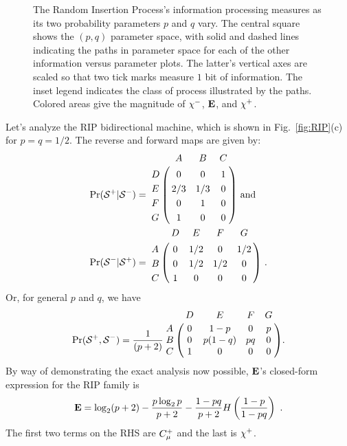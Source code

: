 \begin{figure}[th]
\centering
{}
\caption{The Random Insertion Process's information processing
  measures as its two
  probability parameters $p$ and $q$ vary. The central square
  shows the $(p,q)$ parameter space, with solid and dashed lines
  indicating the paths in parameter space for each of the other
  information versus parameter plots. The latter's vertical axes
  are scaled so that two tick marks measure $1$ bit of information.
  The inset legend indicates the class of process illustrated by
  the paths. Colored areas give the magnitude of
  $\chi^{-}$, ${\bf E}$, and $\chi^{+}$.
  }
\label{fig:RIP_info}
\end{figure}

Let's analyze the RIP bidirectional machine, which is shown in 
Fig.~\ref{fig:RIP}(c) for $p = q = 1/2$. The reverse and forward maps
are given by:
\begin{align*}
\Pr(\FutureCausalState|\PastCausalState) &=
  \bordermatrix{%
      & A   & B   & C \cr
    D & 0   & 0   & 1 \cr
    E & 2/3 & 1/3 & 0 \cr
    F & 0   & 1   & 0 \cr
    G & 1   & 0   & 0 \cr
  }
  \mathrm{~and}\\
\Pr(\PastCausalState|\FutureCausalState) &=
  \bordermatrix{%
      & D  & E   & F   & G \cr
    A & 0  & 1/2 & 0   & 1/2 \cr
    B & 0  & 1/2 & 1/2 & 0 \cr
    C & 1  & 0   & 0   & 0 \cr
  } ~.
\end{align*}
Or, for general $p$ and $q$, we have
\begin{equation*}
\Pr(\FutureCausalState, \PastCausalState) = \frac{1}{(p+2)}
\bordermatrix{
   & D & E & F & G \cr
 A & 0 & 1-p & 0 & p \cr
 B & 0 & p(1-q) & pq & 0 \cr
 C & 1 & 0 & 0 & 0
} .
\end{equation*}
By way of demonstrating the exact analysis now possible, ${\bf E}$'s closed-form
expression for the RIP family is
\begin{align*}
{\bf E} = \log_2 (p+2) - \frac{p \log_2 p }{p + 2} -
\frac{1-pq}{p + 2} H\left( \frac{1-p}{1-pq}\right) ~.
\end{align*}
The first two terms on the RHS are $C_\mu^{+}$ and the last is $\chi^{+}$.

